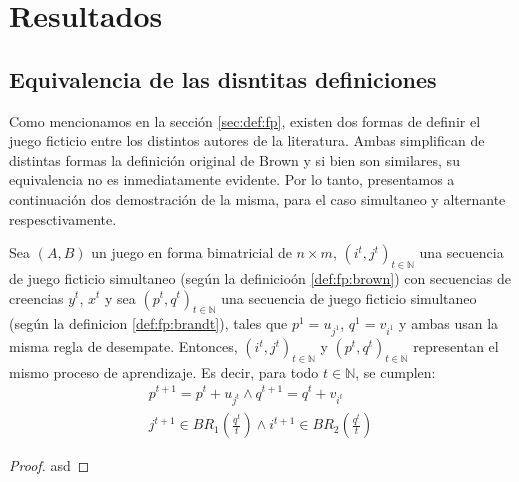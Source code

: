 \chapter{Resultados}  \label{cap:aportes}

\section{Equivalencia de las disntitas definiciones}

Como mencionamos en la sección \ref{sec:def:fp}, existen dos formas de definir el juego ficticio entre los distintos autores de la literatura. Ambas simplifican de distintas formas la definición original de Brown y si bien son similares, su equivalencia no es inmediatamente evidente. Por lo tanto, presentamos a continuación dos demostración de la misma, para el caso simultaneo y alternante respesctivamente.

\begin{theorem}
    Sea $(A, B)$ un juego en forma bimatricial de $n \times m$, $(i^t, j^t)_{t \in \mathbb{N}}$ una secuencia de juego ficticio simultaneo (según la definicioón \ref{def:fp:brown}) con secuencias de creencias $y^t$, $x^t$ y sea $(p^t, q^t)_{t \in \mathbb{N}}$ una secuencia de juego ficticio simultaneo (según la definicion \ref{def:fp:brandt}), tales que $p^1 = u_{j^1}$, $q^1 = v_{i^1}$ y ambas usan la misma regla de desempate. Entonces, $(i^t, j^t)_{t \in \mathbb{N}}$ y $(p^t, q^t)_{t \in \mathbb{N}}$ representan el mismo proceso de aprendizaje. Es decir, para todo $t \in \mathbb{N}$, se cumplen:
    \begin{gather}
        p^{t+1} = p^{t} + u_{j^t} \land q^{t+1} = q^{t} + v_{i^t} \\
        j^{t+1} \in BR_1(\frac{q^t}{t}) \land i^{t+1} \in BR_2(\frac{q^t}{t})
    \end{gather}
\end{theorem}

\begin{proof}
    asd
\end{proof}

